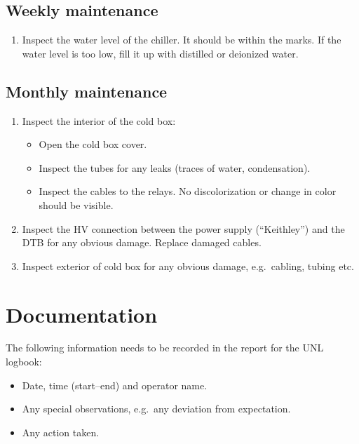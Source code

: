 \documentclass[12pt]{unlsilabsop}
\begin{document}
\subsection{Weekly maintenance}
\begin{enumerate}
    \item Inspect the water level of the chiller. It should be within the marks. If the water level is too low, fill it up with distilled or deionized water.
\end{enumerate}

\subsection{Monthly maintenance}
\begin{enumerate}
    \item Inspect the interior of the cold box:
    \begin{itemize}
        \item Open the cold box cover.
        \item Inspect the tubes for any leaks (traces of water, condensation).
        \item Inspect the cables to the relays. No discolorization or change in color should be visible.
    \end{itemize}
    \item Inspect the HV connection between the power supply (``Keithley'') and the DTB for any obvious damage. Replace damaged cables.
    \item Inspect exterior of cold box for any obvious damage, e.g.~cabling, tubing etc.
\end{enumerate}

\section{Documentation}
The following information needs to be recorded in the report for the UNL logbook:
\begin{itemize}
    \item Date, time (start--end) and operator name.
    \item Any special observations, e.g.~any deviation from expectation.
    \item Any action taken.
\end{itemize}
\end{document}
